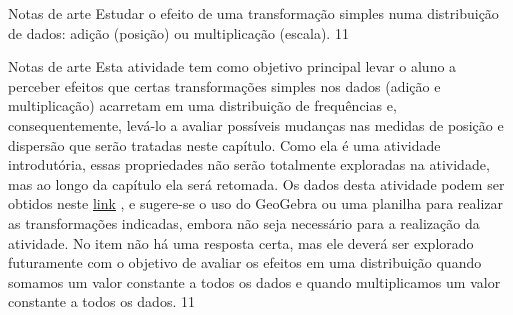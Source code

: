 \def\currentcolor{session1}
\clearmargin
\clearmargin
\begin{objectives}{Notas de arte}
{
Estudar o efeito de uma transformação simples numa distribuição de dados: adição (posição) ou multiplicação (escala).
}{1}{1}
\end{objectives}
\begin{sugestions}{Notas de arte}
{
Esta atividade tem como objetivo principal levar o aluno a perceber efeitos que certas transformações simples nos dados (adição e multiplicação) acarretam em uma distribuição de frequências e, consequentemente, levá-lo a avaliar possíveis mudanças nas medidas de posição e dispersão que serão tratadas neste capítulo. Como ela é uma atividade introdutória, essas propriedades não serão totalmente exploradas na atividade, mas ao longo da capítulo ela será retomada. Os dados desta atividade podem ser obtidos neste \href{https://www.geogebra.org/m/TNh7dPCf}{link} , e sugere-se o uso do GeoGebra ou uma planilha para realizar as transformações indicadas, embora não seja necessário para a realização da atividade. No item  não há uma resposta certa, mas ele deverá ser explorado futuramente com o objetivo de avaliar os efeitos em uma distribuição quando somamos um valor constante a todos os dados e quando multiplicamos um valor constante a todos os dados.
}{1}{1}
\end{sugestions}
\clearmargin
